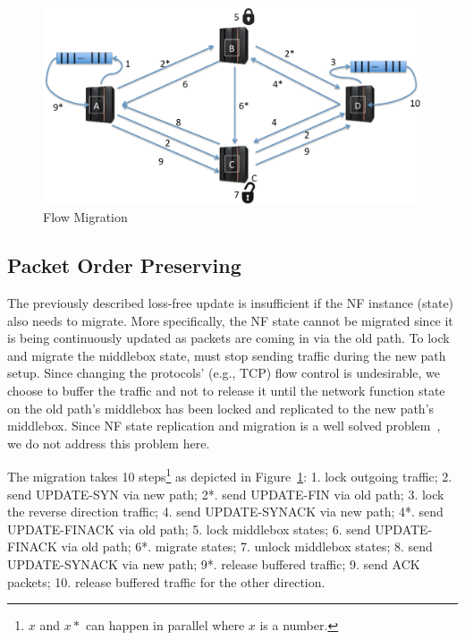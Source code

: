  \begin{figure}[ht]
\centering
\includegraphics[width=\linewidth]{figures/order_preserving.png} 

\caption{Flow Migration} \label{orderpreserving} 
\end{figure}
 
\subsection{Packet Order Preserving} \label{FIFO}
The previously described loss-free update is insufficient if the NF instance (state) also needs to migrate. More specifically, the NF state cannot be migrated since it is being continuously updated as packets are coming in via the old path. To lock and migrate the middlebox state, \system must stop sending traffic during the new path setup. Since changing the protocols' (e.g., TCP) flow control is undesirable, we choose to buffer the traffic and not to release it until the network function state on the old path's middlebox has been locked and replicated to the new path's middlebox. Since NF state replication and migration is a well solved problem~\cite{OpenNF, splitmerge, HAMbox}, we do not address this problem here. 

The migration takes 10 steps\footnote{$x$ and $x*$ can happen in parallel where $x$ is a number.} as depicted in Figure~\ref{orderpreserving}: 
1. lock outgoing traffic; 
2. send UPDATE-SYN via new path; 
2*. send UPDATE-FIN via old path;
3. lock the reverse direction traffic;
4. send UPDATE-SYNACK via new path;
4*. send UPDATE-FINACK via old path;
5. lock middlebox states;
6. send UPDATE-FINACK via old path;
6*. migrate states;
7. unlock middlebox states;
8. send UPDATE-SYNACK via new path;
9*. release buffered traffic;
9. send ACK packets;
10. release buffered traffic for the other direction.
\newline


